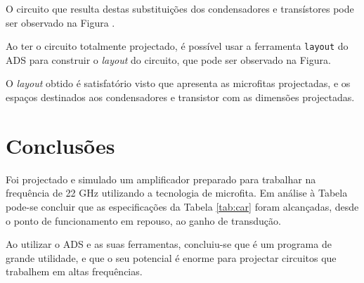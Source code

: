 \documentclass[11pt]{article}
\numberwithin{equation}{section}
\begin{document}
O circuito que resulta destas substituições dos condensadores e transístores pode ser observado na Figura .


Ao ter o circuito totalmente projectado, é possível usar a ferramenta \texttt{layout} do ADS para construir o \textit{layout} do circuito, que pode ser observado na Figura.


O \textit{layout} obtido é satisfatório visto que apresenta as microfitas projectadas, e os espaços destinados aos condensadores e transistor com as dimensões projectadas.
 
\section{Conclusões}

Foi projectado e simulado um amplificador preparado para trabalhar na frequência de 22 GHz utilizando a tecnologia de microfita. Em análise à Tabela pode-se concluir que as especificações da Tabela \ref{tab:car} foram alcançadas, desde o ponto de funcionamento em repouso, ao ganho de transdução.

Ao utilizar o ADS e as suas ferramentas, concluiu-se que é um programa de grande utilidade, e que o seu potencial é enorme para projectar circuitos que trabalhem em altas frequências.
\end{document}
